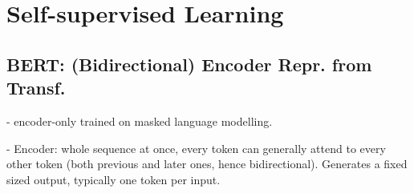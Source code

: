 
\section{Self-supervised Learning}











\subsection*{BERT: (Bidirectional) Encoder Repr. from Transf.}
- encoder-only trained on masked language modelling.

- Encoder: whole sequence at once, every token can generally attend to every other token (both previous and later ones, hence bidirectional). Generates a fixed sized output, typically one token per input.




